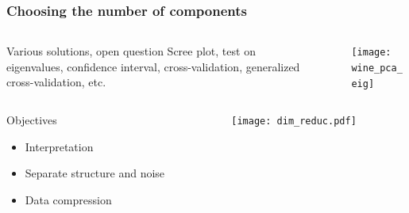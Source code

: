 \documentclass{beamer}\usepackage[]{graphicx}\usepackage[]{color}
\begin{document}
\begin{frame}
  \frametitle{Choosing the number of components}

  \begin{columns}
  \begin{column}{0.68\textwidth}
    \begin{block}{Various solutions, open question}
    Scree plot, test on eigenvalues, confidence interval, cross-validation, generalized cross-validation, etc.
    \end{block}
  \end{column}~~
  \begin{column}{0.3\textwidth}
    \texttt{[image: wine\_pca\_eig]}
  \end{column}
  \end{columns}
  
  \begin{columns}
  \begin{column}{.5\textwidth}
  \begin{block}{Objectives}
    \begin{itemize}
      \item Interpretation
      \item Separate structure and noise
      \item Data compression    
    \end{itemize}
  \end{block}
\end{column}
\begin{column}{0.5\textwidth}
\texttt{[image: dim\_reduc.pdf]}
  \end{column}
  \end{columns}
\end{frame}
\end{document}
